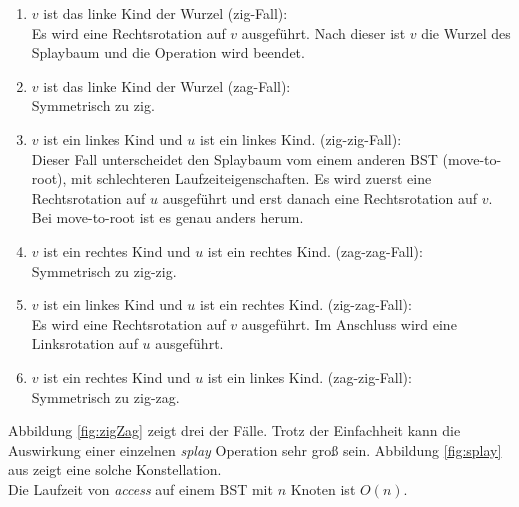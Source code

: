 \documentclass[a4paper,12pt]{article}
\begin{document}
\begin{enumerate}
	\item $v$ ist das linke Kind der Wurzel (zig-Fall):\\
	Es wird eine Rechtsrotation auf $v$ ausgeführt. Nach dieser ist $v$ die Wurzel des Splaybaum und die Operation wird beendet. 
	\item $v$ ist das linke Kind der Wurzel (zag-Fall):\\
	Symmetrisch zu zig.
	\item $v$ ist ein linkes Kind und $u$ ist ein linkes Kind. (zig-zig-Fall):\\
	Dieser Fall unterscheidet den Splaybaum vom einem anderen BST (move-to-root), mit schlechteren Laufzeiteigenschaften. Es wird zuerst eine Rechtsrotation auf $u$ ausgeführt und erst danach eine Rechtsrotation auf $v$. Bei move-to-root  ist es genau anders herum. 
	\item $v$ ist ein rechtes Kind und $u
	$ ist ein rechtes Kind. (zag-zag-Fall):\\
	Symmetrisch zu zig-zig.
	\item $v$ ist ein linkes Kind und $u$ ist ein rechtes Kind. (zig-zag-Fall):\\
	Es wird eine Rechtsrotation auf $v$ ausgeführt. Im Anschluss wird eine Linksrotation auf $u$ ausgeführt.
	\item $v$ ist ein rechtes Kind und $u$ ist ein linkes Kind. (zag-zig-Fall):\\
	Symmetrisch zu zig-zag.

\end{enumerate}
 Abbildung  \ref{fig:zigZag} zeigt drei der Fälle. Trotz der Einfachheit kann die Auswirkung einer einzelnen \textit{splay} Operation sehr groß sein. Abbildung \ref{fig:splay} aus \cite{splay} zeigt eine solche Konstellation. \\
 Die Laufzeit von \textit{access} auf einem BST mit $n$ Knoten ist $O\left(n\right)$.
 
\end{document}
